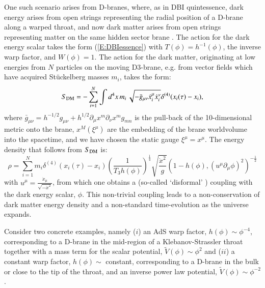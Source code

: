 One such scenario arises from D-branes, where, as in DBI quintessence, dark energy arises from open strings representing the radial position of a D-brane along a warped throat, and now dark matter arises from open strings representing matter on the same hidden sector brane \cite{Koivisto:2013fta}.  The action for the dark energy scalar takes the form (\ref{E:DBIessence}) with $T(\phi)=h^{-1}(\phi)$, the inverse warp factor, and $W(\phi)=1$. The action for the dark matter, originating at low energies from $N$ particles on the moving D3-brane, e.g. from vector fields which have acquired St\"uckelberg masses $m_i$, takes the form:
\begin{equation}
S_{\rm DM} = -\sum_{i=1}^N\int d^4x\, m_i \, \sqrt{-\bar{g}_{\mu\nu}\dot{x}_i^\mu \dot{x}_i^\nu}\delta^{(4)}(x_i(\tau)-x_i),
\end{equation}
where $\bar{g}_{\mu\nu}=h^{-1/2}g_{\mu\nu}+h^{1/2}\partial_\mu x^m \partial_\nu x^m g_{mn}$ is the pull-back of the 10-dimensional metric onto the brane, $x^M(\xi^\mu)$ are the embedding of the brane worldvolume into the spacetime, and we have chosen the static gauge $\xi^\mu=x^\mu$.  The energy density that follows from $S_{\rm DM}$ is:
\begin{equation}
\rho = \sum_{i=1}^N m_i \delta^{(4)}(x_i(\tau)-x_i)\left(\frac{1}{T_3 h(\phi)}\right)^\frac14\sqrt{\frac{\dot{x}^2}{g}}\left(1-h(\phi),(u^\mu\partial_\mu\phi)^2\right)^{-\frac12}
\end{equation}
with $u^\mu = \frac{\dot{x}_\mu}{\sqrt{-\dot{x}^2}}$, from which one obtains a (so-called `disformal' \cite{Bekenstein:1992pj}) coupling with the dark energy scalar, $\phi$.  This non-trivial coupling leads to a non-conservation of dark matter energy density and a non-standard time-evolution as the universe expands.  

Consider two concrete examples, namely ($i$) an AdS warp factor, $h(\phi) \sim \phi^{-4}$, corresponding to a D-brane in the mid-region of a Klebanov-Strassler throat together with a mass term for the scalar potential, $\tilde{V}(\phi) \sim \phi^2$ and ($ii$) a constant warp factor, $h(\phi)\sim$ constant, corresponding to a D-brane in the bulk or close to the tip of the throat, and an inverse power law potential, $\tilde{V}(\phi) \sim \phi^{-2}$. 

